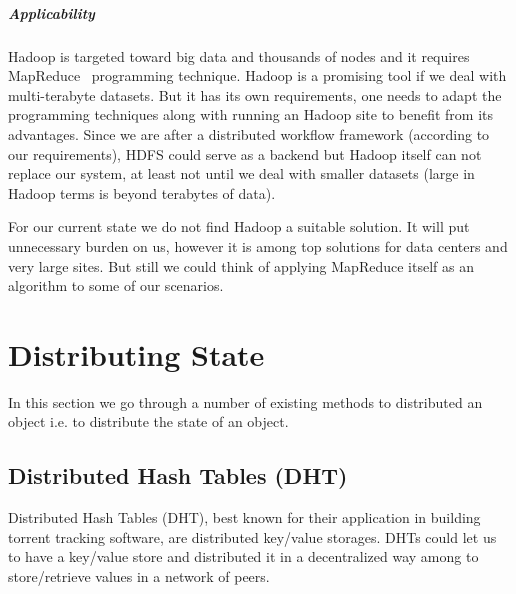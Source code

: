 \subparagraph{Applicability}
Hadoop is targeted toward big data and thousands of nodes and it requires MapReduce~\cite{DG04} programming technique.
Hadoop is a promising tool if we deal with multi-terabyte datasets. 
But it has its own requirements, one needs to adapt the programming techniques along with 
running an Hadoop site to benefit from its advantages. 
Since we are after a distributed workflow framework (according to our requirements), 
HDFS could serve as a backend but Hadoop itself can not replace our system, 
at least not until we deal with smaller datasets (large in Hadoop terms is beyond terabytes of data).

For our current state we do not find Hadoop a suitable solution.
It will put unnecessary burden on us, however it is among top solutions for data centers and very large sites.
But still we could think of applying MapReduce itself as an algorithm to some of our scenarios.

\section{Distributing State}
In this section we go through a number of existing methods to distributed an object i.e. to distribute the state of an object.

\subsection{Distributed Hash Tables (DHT)}
Distributed Hash Tables (DHT), best known for their application in building torrent tracking software,
are distributed key/value storages. DHTs could let us to have a key/value store and distributed it in 
a decentralized way among to store/retrieve values in a network of peers.

